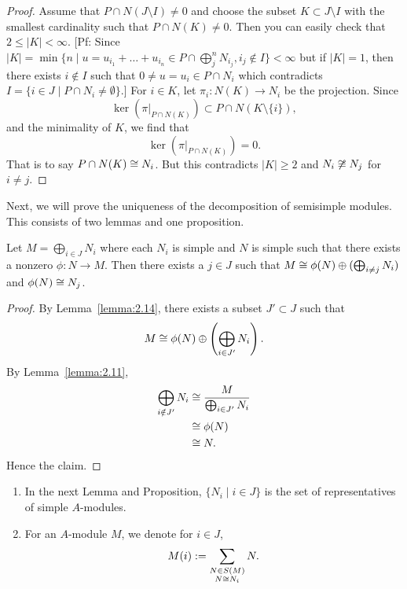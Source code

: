 \begin{proof}
Assume that $P\cap N(J\setminus I)\neq0$ and choose the subset
$K\subset J\setminus I$ with the smallest cardinality such that $P\cap N(K)\neq0$.
Then you can easily check that $2\leq|K|<\infty$.
[Pf: Since $|K|=\min\{n\mid u=u_{i_{1}}+\dots+u_{i_{n}}\in P\cap\bigoplus^{n}_{j}N_{i_{j}},i_{j}\notin I\}<\infty$
but if $|K|=1$, then there exists $i\notin I$ such that $0\neq u=u_{i}\in P\cap N_{i}$
which contradicts $I=\{i\in J\mid P\cap N_{i}\neq\emptyset\}$.]
For $i\in K$, let $\pi_{i}\colon N(K)\to N_{i}$ be the
projection. Since
\begin{equation}
\ker(\pi|_{P\cap N(K)})\subset P\cap N(K\setminus\{i\}),
\end{equation}
and the minimality of $K$, we find that
\begin{equation}
\ker(\pi|_{P\cap N(K)})=0.
\end{equation}
That is to say $P\cap N(K)\cong N_{i}$. But this contradicts $|K|\geq2$
and $N_{i}\not\cong N_{j}$ for $i\neq j$.
\end{proof}

\begin{node}
Next, we will prove the uniqueness of the decomposition of semisimple
modules. This consists of two lemmas and one proposition.
\end{node}

\begin{lemma}\label{lemma:2.17}
Let $M=\bigoplus_{i\in J}N_{i}$ where each $N_{i}$ is simple and $N$
is simple such that there exists a nonzero $\phi\colon N\to M$.
Then there exists a $j\in J$ such that
$M\cong\phi(N)\oplus(\bigoplus_{i\neq j}N_{i})$ and $\phi(N)\cong N_{j}$.
\end{lemma}

\begin{proof}
By Lemma~\ref{lemma:2.14}, there exists a subset $J'\subset J$ such
that
\begin{equation}
M\cong\phi(N)\oplus\left(\bigoplus_{i\in J'}N_{i}\right).
\end{equation}
By Lemma~\ref{lemma:2.11},
\begin{subequations}
  \begin{align}
\bigoplus_{i\notin J'}N_{i} &\cong \frac{M}{\bigoplus_{i\in J'}N_{i}}\\
&\cong\phi(N)\\
&\cong N.
  \end{align}
\end{subequations}
Hence the claim.
\end{proof}

\begin{node}
  \begin{enumerate}
  \item In the next Lemma and Proposition, $\{N_{i}\mid i\in J\}$
is the set of representatives of simple $A$-modules.
\item For an $A$-module
$M$, we denote for $i\in J$,
\begin{equation}
M(i):=\sum_{\substack{N\in S(M)\\ N\cong N_{i}}}N.
\end{equation}
  \end{enumerate}
\end{node}

